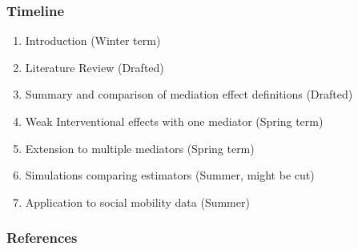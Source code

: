 \documentclass{beamer}
\begin{document}
\begin{frame}
\frametitle{Timeline}
\begin{enumerate}
\item Introduction (Winter term)
\item Literature Review (Drafted)
\item Summary and comparison of mediation effect definitions (Drafted)
\item Weak Interventional effects with one mediator (Spring term)
\item Extension to multiple mediators (Spring term)
\item Simulations comparing estimators (Summer, might be cut)
\item Application to social mobility data (Summer)
\end{enumerate}
\end{frame}

\begin{frame}[allowframebreaks]
        \frametitle{References}
        
        
\end{frame}
\end{document}

